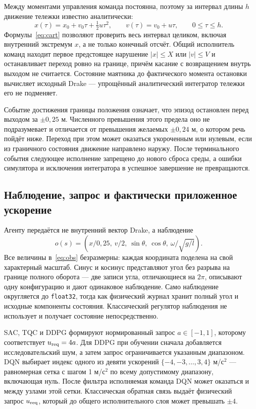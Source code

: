 Между моментами управления команда постоянна, поэтому за интервал длины $h$ движение тележки известно аналитически:
\begin{equation}
x(\tau)=x_0+v_0\tau+\tfrac12u\tau^2,\qquad
v(\tau)=v_0+u\tau,\qquad 0\leq\tau\leq h.
\label{eq:cart}
\end{equation}
Формулы~\eqref{eq:cart} позволяют проверить весь интервал целиком, включая внутренний экстремум $x$, а не только конечный отсчёт. Общий исполнитель команд находит первое предстоящее нарушение $|x|\leq X$ или $|v|\leq V$ и останавливает переход ровно на границе, причём касание с возвращением внутрь выходом не считается. Состояние маятника до фактического момента остановки вычисляет исходный Drake — упрощённый аналитический интегратор тележки его не подменяет.

Событие достижения границы положения означает, что эпизод остановлен перед выходом за $\pm0{,}25$ м. Численного превышения этого предела оно не подразумевает и отличается от превышения желаемых $\pm0{,}24$ м, о котором речь пойдёт ниже. Переход при этом может оказаться укороченным или нулевым, если из граничного состояния движение направлено наружу. После терминального события следующее исполнение запрещено до нового сброса среды, а ошибки симулятора и исключения интегратора в успешное завершение не превращаются.

\subsection{Наблюдение, запрос и фактически приложенное ускорение}
Агенту передаётся не внутренний вектор Drake, а наблюдение
\begin{equation}
o(s)=\left(x/0{,}25,\ v/2,\ \sin\theta,\ \cos\theta,\ \omega/\sqrt{g/l}\right).
\label{eq:obs}
\end{equation}
Все величины в~\eqref{eq:obs} безразмерны: каждая координата поделена на свой характерный масштаб. Синус и косинус представляют угол без разрыва на границе полного оборота — две записи угла, отличающиеся на $2\pi$, описывают одну конфигурацию и дают одинаковое наблюдение. Само наблюдение округляется до \texttt{float32}, тогда как физический журнал хранит полный угол и исходные компоненты состояния. Классический регулятор наблюдения не использует и получает состояние непосредственно.

SAC, TQC и DDPG формируют нормированный запрос $a\in[-1,1]$, которому соответствует $u_{\rm req}=4a$. Для DDPG при обучении сначала добавляется исследовательский шум, а затем запрос ограничивается указанным диапазоном. DQN выбирает индекс одного из девяти ускорений $\{-4,-3,\ldots,3,4\}$ м/с$^2$ — равномерная сетка с шагом 1 м/с$^2$ по всему допустимому диапазону, включающая нуль. После фильтра исполняемая команда DQN может оказаться и между узлами этой сетки. Классическая обратная связь выдаёт физический запрос $u_{\rm req}$, который до общего исполнительного слоя может превышать $\pm4$.

